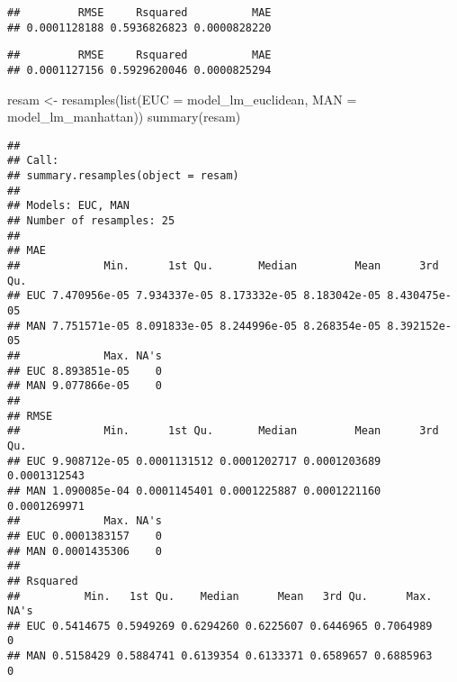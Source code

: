 \documentclass[
]{article}
\newenvironment{Shaded}{\begin{snugshade}}{\end{snugshade}}
\newcommand{\AttributeTok}[1]{\textcolor[rgb]{0.77,0.63,0.00}{#1}}
\newcommand{\FunctionTok}[1]{\textcolor[rgb]{0.00,0.00,0.00}{#1}}
\newcommand{\NormalTok}[1]{#1}
\newcommand{\OtherTok}[1]{\textcolor[rgb]{0.56,0.35,0.01}{#1}}
\newcommand{\SpecialCharTok}[1]{\textcolor[rgb]{0.00,0.00,0.00}{#1}}
\newcommand{\StringTok}[1]{\textcolor[rgb]{0.31,0.60,0.02}{#1}}
\begin{document}
\begin{verbatim}
##         RMSE     Rsquared          MAE 
## 0.0001128188 0.5936826823 0.0000828220
\end{verbatim}

\begin{Shaded}
\end{Shaded}

\begin{verbatim}
##         RMSE     Rsquared          MAE 
## 0.0001127156 0.5929620046 0.0000825294
\end{verbatim}

\begin{Shaded}
\begin{Highlighting}[]
\NormalTok{resam }\OtherTok{\textless{}{-}} \FunctionTok{resamples}\NormalTok{(}\FunctionTok{list}\NormalTok{(}\AttributeTok{EUC =}\NormalTok{ model\_lm\_euclidean,}
                        \AttributeTok{MAN =}\NormalTok{ model\_lm\_manhattan))}
\FunctionTok{summary}\NormalTok{(resam)}
\end{Highlighting}
\end{Shaded}

\begin{verbatim}
## 
## Call:
## summary.resamples(object = resam)
## 
## Models: EUC, MAN 
## Number of resamples: 25 
## 
## MAE 
##             Min.      1st Qu.       Median         Mean      3rd Qu.
## EUC 7.470956e-05 7.934337e-05 8.173332e-05 8.183042e-05 8.430475e-05
## MAN 7.751571e-05 8.091833e-05 8.244996e-05 8.268354e-05 8.392152e-05
##             Max. NA's
## EUC 8.893851e-05    0
## MAN 9.077866e-05    0
## 
## RMSE 
##             Min.      1st Qu.       Median         Mean      3rd Qu.
## EUC 9.908712e-05 0.0001131512 0.0001202717 0.0001203689 0.0001312543
## MAN 1.090085e-04 0.0001145401 0.0001225887 0.0001221160 0.0001269971
##             Max. NA's
## EUC 0.0001383157    0
## MAN 0.0001435306    0
## 
## Rsquared 
##          Min.   1st Qu.    Median      Mean   3rd Qu.      Max. NA's
## EUC 0.5414675 0.5949269 0.6294260 0.6225607 0.6446965 0.7064989    0
## MAN 0.5158429 0.5884741 0.6139354 0.6133371 0.6589657 0.6885963    0
\end{verbatim}
\end{document}
